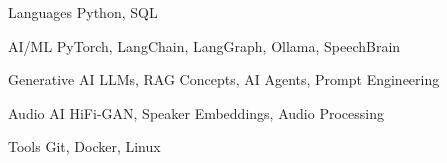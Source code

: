 

\ResumeSkillCategory
    {Languages}
    {Python, SQL}

\ResumeSkillCategory
    {AI/ML}
    {PyTorch, LangChain, LangGraph, Ollama, SpeechBrain}

\ResumeSkillCategory
    {Generative AI}
    {LLMs, RAG Concepts, AI Agents, Prompt Engineering}

\ResumeSkillCategory
    {Audio AI}
    {HiFi-GAN, Speaker Embeddings, Audio Processing}

\ResumeSkillCategory
    {Tools}
    {Git, Docker, Linux}